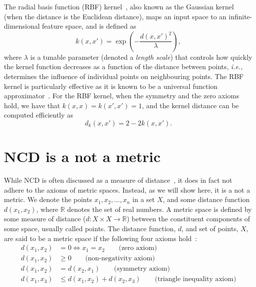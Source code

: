 \documentclass[preprint,12pt]{article}
\begin{document}
\label{rbf_kernel}

The radial basis function (RBF) kernel~\cite{kernels}, also known as the Gaussian kernel (when the distance is the Euclidean distance), maps an input space to an infinite-dimensional feature space, and is defined as
$$
    k(x, x') = \exp\left(-\frac{d(x, x')^2}{\lambda}\right),
$$
where $\lambda$ is a tunable parameter (denoted a \textit{length scale}) that controls how quickly the kernel function decreases as a function of the distance between points, \textit{i.e.}, determines the influence of individual points on neighbouring points.
The RBF kernel is particularly effective as it is known to be a universal function approximator~\cite{}.
For the RBF kernel, when the symmetry and the zero axioms hold, we have that $k(x,x) = k(x',x') = 1$, and the kernel distance can be computed efficiently as
$$
    d_k(x, x') = 2 - 2 k(x, x').
$$







\section{NCD is a not a metric}
\label{pseudometric}
\label{metric_spaces}
While NCD is often discussed as a measure of distance~\cite{opitz2023gzip,weinreich2023parameter,nishida2011tweet,jiang2022less,ncd}, it does in fact not adhere to the axioms of metric spaces. 
Instead, as we will show here, it is a not a metric.
We denote the points $x_1,x_2,\ldots,x_n$  in a set $X$, and some distance function $d(x_1,x_2)$, where  $\mathbb{R}$ denotes the set of real numbers. 
A metric space is defined by some measure of distance ($d:X \times X \rightarrow \mathbb{R}$) between the constituent components of some space, usually called points. 
The distance function, $d$, and set of points,  $X$, are said to be a metric space if the following four axioms hold~\cite{metrics}:
\begin{align}
    d(x_1,x_2) &= 0 \iff x_1 = x_2 \qquad\text{(zero axiom)} \label{eq:axioms_zero}\\
    d(x_1,x_2) &\geq 0 \qquad\text{(non-negativity axiom)} \\
    d(x_1,x_2) &= d(x_2, x_1) \qquad\text{(symmetry axiom)} \\
    d(x_1,x_3) & \leq d(x_1,x_2) + d(x_2,x_3) \qquad\text{(triangle inequality axiom)} \label{eq:axiom_triangle_inequality}
\end{align}
\end{document}
